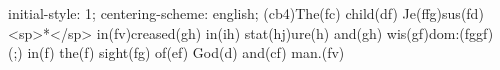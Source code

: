initial-style: 1;
centering-scheme: english;
(cb4)The(fc) child(df) Je(ffg)sus(fd) <sp>*</sp> in(fv)creased(gh) in(ih) stat(hj)ure(h) and(gh) wis(gf)dom:(fggf) (;) in(f) the(f) sight(fg) of(ef) God(d) and(cf) man.(fv)

